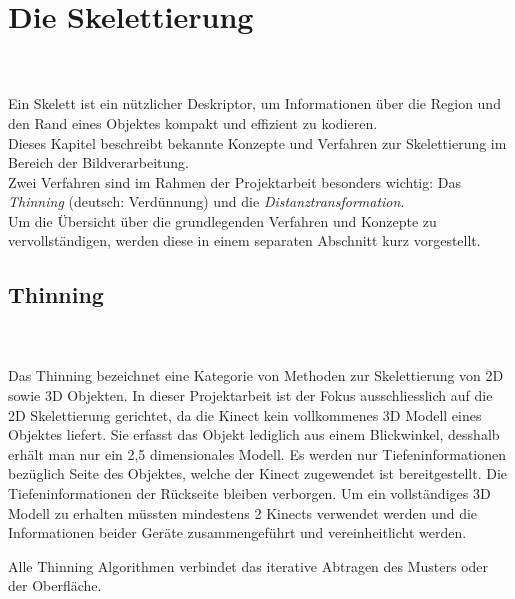 \chapter{Die Skelettierung}
\\\\
Ein Skelett ist ein nützlicher Deskriptor, um Informationen über die Region und den Rand eines Objektes kompakt und effizient
zu kodieren. \\
Dieses Kapitel beschreibt bekannte Konzepte und Verfahren zur Skelettierung im Bereich der Bildverarbeitung.\\
Zwei Verfahren sind im Rahmen der Projektarbeit besonders wichtig: Das \emph{Thinning} (deutsch: Verdünnung) und die \emph{Distanztransformation}. \\
Um die Übersicht über die grundlegenden Verfahren und Konzepte zu vervollständigen, werden diese in einem separaten 
Abschnitt kurz vorgestellt. 
\section{Thinning}
\\\\
Das Thinning bezeichnet eine Kategorie von Methoden zur Skelettierung von 2D sowie 3D Objekten. In dieser Projektarbeit ist der Fokus ausschliesslich auf die 2D Skelettierung gerichtet, da die Kinect kein vollkommenes 3D Modell eines Objektes liefert. Sie erfasst das Objekt lediglich aus einem Blickwinkel, desshalb erhält man nur ein 2,5 dimensionales Modell. Es werden nur Tiefeninformationen bezüglich Seite des Objektes, welche der Kinect zugewendet ist bereitgestellt. Die  Tiefeninformationen der Rückseite bleiben verborgen. Um ein vollständiges 3D Modell zu erhalten müssten mindestens 2 Kinects verwendet werden und die Informationen beider Geräte zusammengeführt und vereinheitlicht werden. 

Alle Thinning Algorithmen verbindet das iterative Abtragen des Musters oder der Oberfläche.

